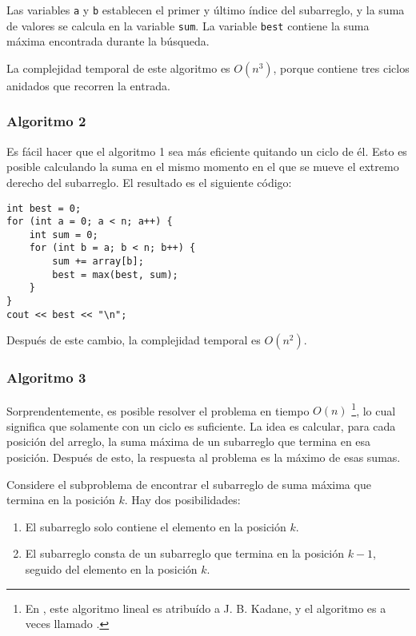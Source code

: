 Las variables \texttt{a} y \texttt{b} establecen el primer y
último índice del subarreglo,
y la suma de valores se calcula en la variable \texttt{sum}.
La variable \texttt{best} contiene la suma máxima encontrada durante la búsqueda.

La complejidad temporal de este algoritmo es $O(n^3)$,
porque contiene tres ciclos anidados 
que recorren la entrada.

\subsubsection{Algoritmo 2}

Es fácil hacer que el algoritmo 1 sea más eficiente
quitando un ciclo de él.
Esto es posible calculando la suma en el mismo
momento en el que se mueve el extremo derecho del subarreglo.
El resultado es el siguiente código:

\begin{lstlisting}
int best = 0;
for (int a = 0; a < n; a++) {
    int sum = 0;
    for (int b = a; b < n; b++) {
        sum += array[b];
        best = max(best, sum);
    }
}
cout << best << "\n";
\end{lstlisting}
Después de este cambio, la complejidad temporal es $O(n^2)$.

\subsubsection{Algoritmo 3}

Sorprendentemente, es posible resolver el problema
en tiempo $O(n)$ \footnote{En \cite{ben86}, este algoritmo lineal
es atribuído a J. B. Kadane, y el algoritmo es a veces
llamado  .}, lo cual significa
que solamente con un ciclo es suficiente.
La idea es calcular, para cada posición del arreglo,
la suma máxima de un subarreglo que termina en esa posición.
Después de esto, la respuesta al problema es la
máximo de esas sumas.

Considere el subproblema de encontrar el subarreglo de suma máxima
que termina en la posición $k$.
Hay dos posibilidades:
\begin{enumerate}
\item El subarreglo solo contiene el elemento en la posición $k$.
\item El subarreglo consta de un subarreglo que termina
en la posición $k-1$, seguido del elemento en la posición $k$.
\end{enumerate}

